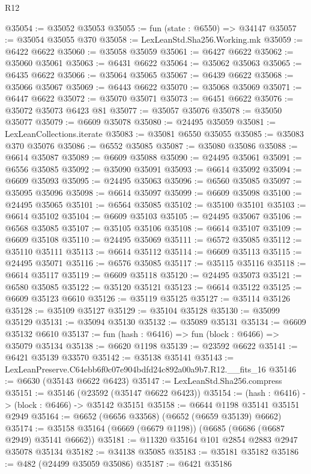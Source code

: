 \begin{lexlean}{R12}
\begin{coremodule}
@35054 := @35052 @35053
@35055 := fun (state : @6550) => @34147
@35057 := @35054 @35055 @370
@35058 := LexLeanStd.Sha256.Working.mk
@35059 := @6422 @6622
@35060 := @35058 @35059
@35061 := @6427 @6622
@35062 := @35060 @35061
@35063 := @6431 @6622
@35064 := @35062 @35063
@35065 := @6435 @6622
@35066 := @35064 @35065
@35067 := @6439 @6622
@35068 := @35066 @35067
@35069 := @6443 @6622
@35070 := @35068 @35069
@35071 := @6447 @6622
@35072 := @35070 @35071
@35073 := @6451 @6622
@35076 := @35072 @35073 @6423 @81
@35077 := @35057 @35076
@35078 := @35050 @35077
@35079 := @6609 @35078
@35080 := @24495 @35059
@35081 := LexLeanCollections.iterate
@35083 := @35081 @6550 @35055
@35085 := @35083 @370 @35076
@35086 := @6552 @35085
@35087 := @35080 @35086
@35088 := @6614 @35087
@35089 := @6609 @35088
@35090 := @24495 @35061
@35091 := @6556 @35085
@35092 := @35090 @35091
@35093 := @6614 @35092
@35094 := @6609 @35093
@35095 := @24495 @35063
@35096 := @6560 @35085
@35097 := @35095 @35096
@35098 := @6614 @35097
@35099 := @6609 @35098
@35100 := @24495 @35065
@35101 := @6564 @35085
@35102 := @35100 @35101
@35103 := @6614 @35102
@35104 := @6609 @35103
@35105 := @24495 @35067
@35106 := @6568 @35085
@35107 := @35105 @35106
@35108 := @6614 @35107
@35109 := @6609 @35108
@35110 := @24495 @35069
@35111 := @6572 @35085
@35112 := @35110 @35111
@35113 := @6614 @35112
@35114 := @6609 @35113
@35115 := @24495 @35071
@35116 := @6576 @35085
@35117 := @35115 @35116
@35118 := @6614 @35117
@35119 := @6609 @35118
@35120 := @24495 @35073
@35121 := @6580 @35085
@35122 := @35120 @35121
@35123 := @6614 @35122
@35125 := @6609 @35123 @6610
@35126 := @35119 @35125
@35127 := @35114 @35126
@35128 := @35109 @35127
@35129 := @35104 @35128
@35130 := @35099 @35129
@35131 := @35094 @35130
@35132 := @35089 @35131
@35134 := @6609 @35132 @6610
@35137 := fun (hash : @6416) => fun (block : @6466) => @35079 @35134
@35138 := @6620 @1198
@35139 := @23592 @6622
@35141 := @6421 @35139 @33570
@35142 := @35138 @35141
@35143 := LexLeanPreserve.C64ebb6f0c07e904bdfd24c892a00a9b7.R12.__fits_16
@35146 := @6630 (@35143 @6622 @6423)
@35147 := LexLeanStd.Sha256.compress
@35151 := @35146 (@23592 (@35147 @6622 @6423))
@35154 := (hash : @6416) -> (block : @6466) -> @35142 @35151
@35158 := @6644 @1198 @35141 @35151 @2949
@35164 := @6652 (@6656 @33568) (@6652 (@6659 @35139) @6662)
@35174 := @35158 @35164 (@6669 (@6679 @1198)) (@6685 (@6686 (@6687 @2949) @35141 @6662))
@35181 := @11320 @35164 @101 @2854 @2883 @2947 @35078 @35134
@35182 := @34138 @35085
@35183 := @35181 @35182
@35186 := @482 (@24499 @35059 @35086)
@35187 := @6421 @35186

\end{coremodule}
\end{lexlean}
